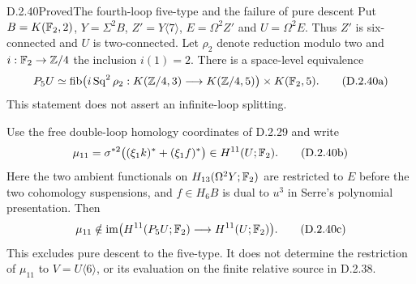 \begin{claim}{D.2.40}{Proved}{The fourth-loop five-type and the failure of pure descent}
Put $B=K(\mathbb F_2,2)$, $Y=\Sigma^2B$, $Z'=Y\langle7\rangle$,
$E=\Omega^2Z'$ and $U=\Omega^2E$.  Thus $Z'$ is six-connected
and $U$ is two-connected.  Let $\rho_2$ denote reduction modulo two
and $i:\mathbb F_2\to\mathbb Z/4$ the inclusion $i(1)=2$.
There is a space-level equivalence
\[
 P_5U\simeq
 \operatorname{fib}\bigl(i\operatorname{Sq}^2\rho_2:
      K(\mathbb Z/4,3)\longrightarrow K(\mathbb Z/4,5)\bigr)
       \times K(\mathbb F_2,5).
 \tag{D.2.40a}
\]
This statement does not assert an infinite-loop splitting.

Use the free double-loop homology coordinates of D.2.29 and write
\[
 \mu_{11}=\sigma^{*2}\bigl((\xi_1k)^*+(\xi_1f)^*\bigr)
       \in H^{11}(U;\mathbb F_2).
 \tag{D.2.40b}
\]
Here the two ambient functionals on $H_{13}(\Omega^2Y;\mathbb F_2)$
are restricted to $E$ before the two cohomology suspensions, and
$f\in H_6B$ is dual to $u^3$ in Serre's polynomial presentation.
Then
\[
 \mu_{11}\notin
 \operatorname{im}\bigl(H^{11}(P_5U;\mathbb F_2)
                       \longrightarrow H^{11}(U;\mathbb F_2)\bigr).
 \tag{D.2.40c}
\]
This excludes pure descent to the five-type.  It does not determine
the restriction of $\mu_{11}$ to $V=U\langle6\rangle$, or its
evaluation on the finite relative source in D.2.38.
\end{claim}
